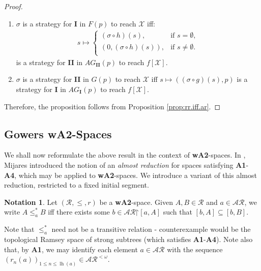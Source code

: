 \documentclass[11pt,reqno]{amsart}
\theoremstyle{plain}
\numberwithin{equation}{section}
\theoremstyle{definition}
\newtheorem{notation}[theorem]{Notation}
\newcommand{\func}{\operatorname}
\newcommand{\cal}{\mathcal}
\newcommand{\restrictedto}{\mathord{\upharpoonright}}
\newcommand{\X}{\cal{X}}
\newcommand{\lh}{\func{lh}}
\begin{document}
\begin{proof}
\begin{enumerate}
        \item $\sigma$ is a strategy for \textbf{I} in $F(p)$ to reach $\X$ iff:
        \begin{align*}
            s \mapsto 
            \begin{cases}
                (\sigma \circ h)(s), &\text{if $s = \emptyset$}, \\
                (0,(\sigma \circ h)(s)), &\text{if $s \neq \emptyset$}. \\
            \end{cases}
        \end{align*}
        is a strategy for \textbf{II} in $AG_\textbf{II}(p)$ to reach $f[\X]$.

        \item $\sigma$ is a strategy for \textbf{II} in $G(p)$ to reach $\X$ iff $s \mapsto ((\sigma \circ g)(s),p)$ is a strategy for \textbf{I} in $AG_\textbf{I}(p)$ to reach $f[\X]$.
    \end{enumerate}
    Therefore, the proposition follows from Proposition \ref{prop:rr.iff.ar}.
\end{proof}


\subsection{Gowers \textbf{wA2}-Spaces}
We shall now reformulate the above result in the context of \textbf{wA2}-spaces. In \cite{M07}, Mijares introduced the notion of an \emph{almost reduction} for spaces satisfying \textbf{A1}-\textbf{A4}, which may be applied to \textbf{wA2}-spaces. We introduce a variant of this almost reduction, restricted to a fixed initial segment.

\begin{notation}
    Let $(\cal{R},\leq,r)$ be a \textbf{wA2}-space. Given $A,B \in \cal{R}$ and $a \in \cal{AR}$, we write $A \leq_a^* B$ iff there exists some $b \in \cal{AR}\restrictedto[a,A]$ such that $[b,A] \subseteq [b,B]$.
\end{notation}

Note that $\leq_a^*$ need not be a transitive relation - counterexample would be the topological Ramsey space of strong subtrees (which satisfies \textbf{A1}-\textbf{A4}). Note also that, by \textbf{A1}, we may identify each element $a \in \cal{AR}$ with the sequence $(r_n(a))_{1 \leq n \leq \lh(a)} \in \cal{AR}^{<\omega}$.
\end{document}
